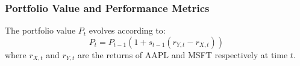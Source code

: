\subsubsection{Portfolio Value and Performance Metrics}

The portfolio value $P_t$ evolves according to:
\begin{equation*}
	P_t = P_{t-1}(1 + s_{t-1}(r_{Y,t} - r_{X,t}))
\end{equation*}
where $r_{X,t}$ and $r_{Y,t}$ are the returns of AAPL and MSFT respectively at time $t$.
